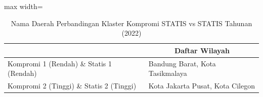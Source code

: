 \begin{table}[H]
\centering
\caption{Nama Daerah Perbandingan Klaster Kompromi STATIS vs STATIS Tahunan (2022)} \label{tab:sample2comp_statis_name_2022}
\begin{adjustbox}{max width=\textwidth}
\begin{tabular}{|>{\centering\arraybackslash}p{4cm}|p{10cm}|}
\hline
\multicolumn{1}{|c|}{\textbf{Kategori}} & \multicolumn{1}{c|}{\textbf{Daftar Wilayah}} \\
\hline
Kompromi 1 (Rendah) \& Statis 1 (Rendah) & Bandung Barat, Kota Tasikmalaya \\
\hline
Kompromi 2 (Tinggi) \& Statis 2 (Tinggi) & Kota Jakarta Pusat, Kota Cilegon \\
\hline
\end{tabular}
\end{adjustbox}
\end{table}